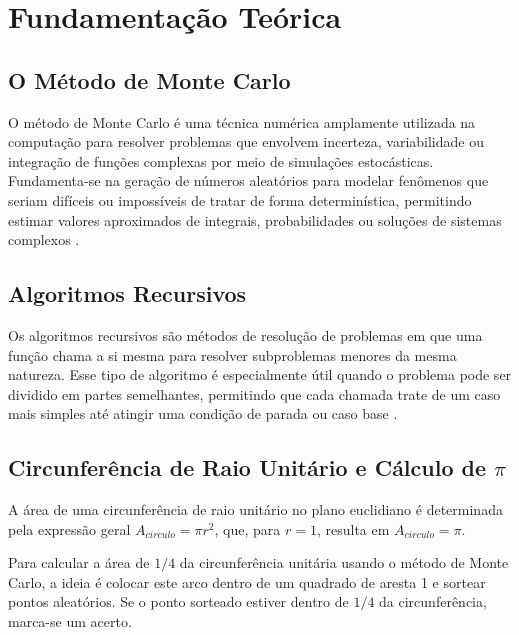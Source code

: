 \chapter{Fundamentação Teórica}\label{cap:desenvolvimento}

\section{O Método de Monte Carlo}

O método de Monte Carlo \cite{fishman1996} é uma técnica numérica amplamente utilizada na computação para resolver problemas que envolvem incerteza, variabilidade ou integração de funções complexas por meio de simulações estocásticas. Fundamenta-se na geração de números aleatórios para modelar fenômenos que seriam difíceis ou impossíveis de tratar de forma determinística, permitindo estimar valores aproximados de integrais, probabilidades ou soluções de sistemas complexos \cite{metropolis1949}.

\section{Algoritmos Recursivos}

Os algoritmos recursivos são métodos de resolução de problemas em que uma função chama a si mesma para resolver subproblemas menores da mesma natureza. Esse tipo de algoritmo é especialmente útil quando o problema pode ser dividido em partes semelhantes, permitindo que cada chamada trate de um caso mais simples até atingir uma condição de parada ou caso base \cite{rosen2012}.

\section{Circunferência de Raio Unitário e Cálculo de \texorpdfstring{$\pi$}{pi}}

A área de uma circunferência de raio unitário no plano euclidiano é determinada pela expressão geral $A_{circulo} = \pi r^{2}$, que, para $r=1$, resulta em $A_{circulo} = \pi$.

Para calcular a área de $1/4$ da circunferência unitária usando o método de Monte Carlo, a ideia é colocar este arco dentro de um quadrado de aresta 1 e sortear pontos aleatórios. Se o ponto sorteado estiver dentro de $1/4$ da circunferência, marca-se um acerto.

